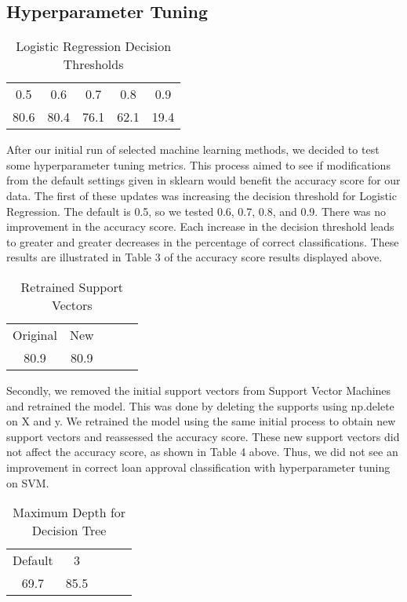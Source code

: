 \documentclass{article}
\begin{document}
 \subsection{Hyperparameter Tuning}
\begin{table}
    \centering
    \begin{tabular}{ccccc}
          0.5& 0.6& 0.7& 0.8& 0.9\\
          80.6&  80.4& 76.1& 62.1& 19.4\\
    \end{tabular}
    \caption{Logistic Regression Decision Thresholds}
    \label{tab:my_label}
\end{table}
\FloatBarrier
After our initial run of selected machine learning methods, we decided to test some hyperparameter tuning metrics. This process aimed to see if modifications from the default settings given in sklearn would benefit the accuracy score for our data. The first of these updates was increasing the decision threshold for Logistic Regression. The default is 0.5, so we tested 0.6, 0.7, 0.8, and 0.9. There was no improvement in the accuracy score. Each increase in the decision threshold leads to greater and greater decreases in the percentage of correct classifications. These results are illustrated in Table 3 of the accuracy score results displayed above.

 \begin{table} [h]
    \centering
    \begin{tabular}{ccccc}
          Original& New\\
          80.9& 80.9\\
    \end{tabular}
    \caption{Retrained Support Vectors}
    \label{tab:my_label}
\end{table}
\FloatBarrier
Secondly, we removed the initial support vectors from Support Vector Machines and retrained the model. This was done by deleting the supports using np.delete on X and y. We retrained the model using the same initial process to obtain new support vectors and reassessed the accuracy score. These new support vectors did not affect the accuracy score, as shown in Table 4 above. Thus, we did not see an improvement in correct loan approval classification with hyperparameter tuning on SVM.  

 \begin{table} [h]
    \centering
    \begin{tabular}{ccccc}
          Default& 3\\
          69.7& 85.5\\
    \end{tabular}
    \caption{Maximum Depth for Decision Tree}
    \label{tab:my_label}
\end{table}
\end{document}
